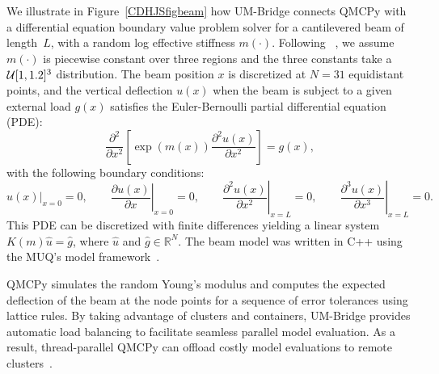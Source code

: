 \documentclass[graybox]{svmult}
\begin{document}
We illustrate in Figure~\ref{CDHJSfigbeam} how UM-Bridge connects QMCPy with a differential equation boundary value problem solver for a cantilevered beam of length~$L$, with a random log effective stiffness $m(\cdot)$. Following ~\cite{ParSee22a}, we assume $m(\cdot)$ is piecewise constant over three regions and the three constants take a ${\mathcal{U}}[1,1.2]^3$ distribution.
The beam position $x$ is discretized at $N=31$ equidistant points, and
the vertical deflection $u(x)$ when the beam is subject to a given external load  $g(x)$ satisfies the Euler-Bernoulli partial differential equation (PDE):
$$ \frac{\partial^2}{\partial x^2}\left[ \exp(m(x)) \frac{\partial^2  u(x)}{\partial x^2}\right] = g(x),$$
with the following boundary conditions:
$$ \left.u(x)\right|_{x=0} = 0, \qquad
\left.\frac{\partial u(x)}{\partial x}\right|_{x=0} = 0, \qquad
\left.\frac{\partial^2 u(x)}{\partial x^2}\right|_{x=L} = 0, \qquad  \left.\frac{\partial^3 u(x)}{\partial x^3}\right|_{x=L} = 0. $$
This PDE can be discretized with finite differences yielding a linear system $K(m) \hat{u} = \hat{g}$, where $\hat{u}$ and $\hat{g} \in \mathbb{R}^N$.
The beam model was written in C++ using the MUQ's model framework~\cite{MUQ2}. %

QMCPy simulates the random Young's modulus and computes the expected deflection of the beam at the node points for a sequence of error tolerances using lattice rules.  By taking advantage of clusters and containers, UM-Bridge provides automatic load balancing to facilitate seamless parallel model evaluation. As a result, thread-parallel QMCPy can offload costly model evaluations to remote clusters~\cite{seelinger2023lowering}.
\end{document}
